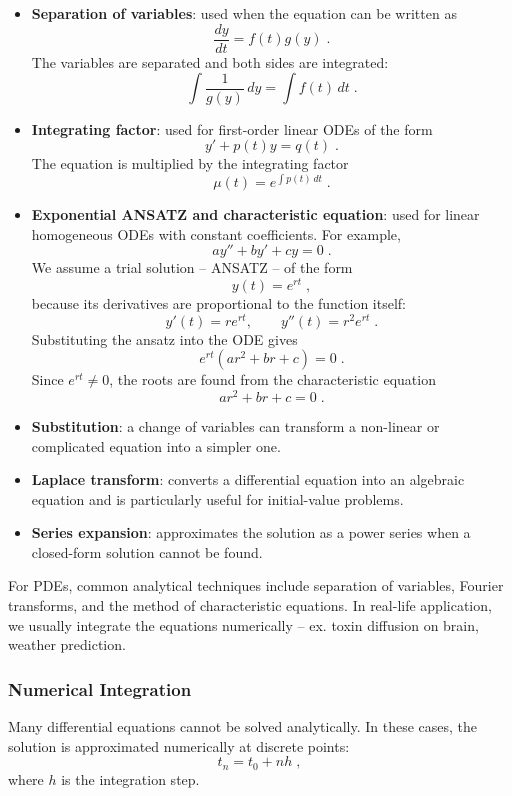 \documentclass[12pt,a4paper]{article}
\begin{document}
\begin{itemize}
	\item \textbf{Separation of variables}: used when the equation can be written as
	$$
	\frac{dy}{dt} = f(t)g(y)\;.
	$$
	The variables are separated and both sides are integrated:
	$$
	\int \frac{1}{g(y)}\,dy = \int f(t)\,dt\;.
	$$
	
	\item \textbf{Integrating factor}: used for first-order linear ODEs of the form
	$$
	y' + p(t)y = q(t)\;.
	$$
	The equation is multiplied by the integrating factor
	$$
	\mu(t) = e^{\int p(t)\,dt}\;.
	$$
		
	\item \textbf{Exponential ANSATZ and characteristic equation}: used for linear homogeneous ODEs with constant coefficients. For example,
	$$
	ay'' + by' + cy = 0\;.
	$$
	We assume a trial solution -- ANSATZ -- of the form
	$$
	y(t) = e^{rt}\;,
	$$
	because its derivatives are proportional to the function itself:
	$$
	y'(t) = re^{rt},
	\qquad
	y''(t) = r^2e^{rt}\;.
	$$
	Substituting the ansatz into the ODE gives
	$$
	e^{rt}\left(ar^2 + br + c\right) = 0\;.
	$$
	Since $e^{rt} \neq 0$, the roots are found from the characteristic equation
	$$
	ar^2 + br + c = 0\;.
	$$
		
	\item \textbf{Substitution}: a change of variables can transform a non-linear or complicated equation into a simpler one.
	
	\item \textbf{Laplace transform}: converts a differential equation into an algebraic equation and is particularly useful for initial-value problems.
	
	\item \textbf{Series expansion}: approximates the solution as a power series when a closed-form solution cannot be found.
\end{itemize}

For PDEs, common analytical techniques include separation of variables, Fourier transforms, and the method of characteristic equations. In real-life application, we usually integrate the equations numerically -- ex. toxin diffusion on brain, weather prediction.

\subsubsection*{Numerical Integration}

Many differential equations cannot be solved analytically. In these cases, the solution is approximated numerically at discrete points:
$$
t_n = t_0 + nh\;,
$$
where $h$ is the integration step.
\end{document}
